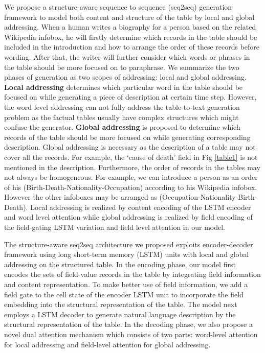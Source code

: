 \documentclass[letterpaper]{article} \usepackage{aaai18}  \usepackage{times}  \usepackage{helvet}  \usepackage{courier}  \usepackage{url}  \usepackage{graphicx}  \frenchspacing  \setlength{\pdfpagewidth}{8.5in}  \setlength{\pdfpageheight}{11in}  \usepackage{amsmath}
\begin{document}
We propose a structure-aware sequence to sequence (seq2seq) generation framework to model both content and structure of the table by local and global addressing. 
When a human writes a biography for a person based on the related Wikipedia infobox, he will firstly determine which records in the table should be included in the introduction and how to arrange the order of these records before wording. 
After that, the writer will further consider which words or phrases in the table should be more focused on to paraphrase.
We summarize the two phases of generation as two scopes of addressing: local and global addressing.
\textbf{Local addressing} determines which particular word in the table should be focused on while generating a piece of description at certain time step. 
However, the word level addressing can not fully address the table-to-text generation problem as the factual tables usually have complex structures which might confuse the generator.
\textbf{Global addressing} is proposed to determine which records of the table should be more focused on while generating corresponding description.
Global addressing is necessary as the description of a table may not cover all the records. For example, the `cause of death' field in Fig \ref{table1} is not mentioned in the description.
Furthermore, the order of records in the tables may not always be homogeneous. For example, we can introduce a person as an order of his (Birth-Death-Nationality-Occupation) according to his Wikipedia infobox. However the other infoboxes may be arranged as (Occupation-Nationality-Birth-Death).
Local addressing is realized by content encoding of the LSTM encoder and word level attention 
while global addressing is realized by field encoding of the field-gating LSTM variation and field level attention in our model.


The structure-aware seq2seq architecture we proposed exploits encoder-decoder framework using long short-term memory (LSTM) \cite{hochreiter1997long} units with local and global addressing on the structured table.   
In the encoding phase, our model first encodes the sets of field-value records in the table by integrating field information and content representation.
To make better use of field information, we add a field gate to the cell state of the encoder LSTM unit to incorporate the field embedding into the structural representation of the table.
The model next employs a LSTM decoder to generate natural language description by the structural representation of the table.
In the decoding phase, we also propose a novel dual attention mechanism which consists of two parts: word-level attention for local addressing and field-level attention for global addressing.
\end{document}
